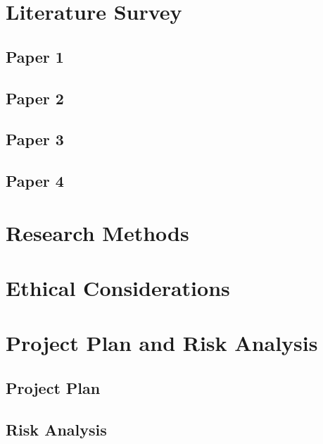 \documentclass[runningheads]{llncs}
\begin{document}
\section{Literature Survey}

    \subsection{Paper 1}

    \subsection{Paper 2}

    \subsection{Paper 3}

    \subsection{Paper 4}


\section{Research Methods}


\section{Ethical Considerations}


\section{Project Plan and Risk Analysis}
    \subsection{Project Plan}

    \subsection{Risk Analysis}

\newpage
\printbibliography
{}
\end{document}
